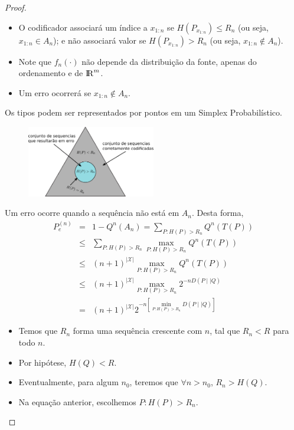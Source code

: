 \begin{frame}[allowframebreaks]
\begin{proof}
  \begin{itemize}
  \item O codificador associará um índice a $x_{1:n}$ se $H(P_{x_{1:n}}) \leq  R_n$ (ou seja, $x_{1:n} \in A_n$); 
  e não associará valor se $H(P_{x_{1:n}}) >  R_n$ (ou seja, $x_{1:n} \notin A_n$).
  \item Note que $f_n(\cdot)$ não depende da distribuição da fonte, apenas do ordenamento e de ${\rm I\!R}^m$.
  \item Um erro ocorrerá se $x_{1:n} \notin A_n$.
  \end{itemize}
  
  \proofbreak
  Os tipos podem ser representados por pontos em um Simplex Probabilístico.
    \begin{figure}[h!]
    \centering
    \includegraphics[width=0.5\textwidth]{images/type-simplex.pdf}
    \label{fig:type-simplex}
    \end{figure}

  \proofbreak

  Um erro ocorre quando a sequência não está em $A_n$. Desta forma,
  \begin{eqnarray}
  P_e^{(n)} &=& 1 - Q^n(A_n) = \sum_{P: H(P) > R_n} Q^n (T(P)) \nonumber \\
	&\leq& \sum_{P: H(P) > R_n} \max_{P: H(P) > R_n} Q^n (T(P)) \nonumber \\
	&\leq& (n+1)^{\vert \mathcal{X} \vert} \max_{P: H(P) > R_n} Q^n (T(P)) \nonumber \\
	&\leq& (n+1)^{\vert \mathcal{X} \vert} \max_{P: H(P) > R_n} 2^{-n  D(P \mid\mid Q)} \nonumber \\
	&=& (n+1)^{\vert \mathcal{X} \vert} 2^{-n [\min_{P: H(P) > R_n} D(P \mid\mid Q)]}
  \end{eqnarray}


  \proofbreak

  \begin{itemize}
  \item Temos que $R_n$ forma uma sequência crescente com $n$, tal que $R_n < R$ para todo $n$.
  \item Por hipótese, $H(Q) < R$.
  \item Eventualmente, para algum $n_0$, teremos que $\forall n > n_0$, $R_n > H(Q)$.
  \item Na equação anterior, escolhemos $P: H(P) > R_n$.


\end{itemize}
\end{proof}
\end{frame}
